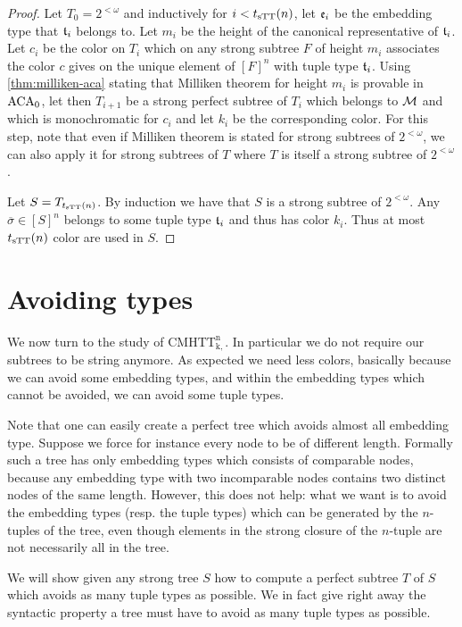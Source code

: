 \begin{proof}
Let $T_0 = 2^{<\omega}$ and inductively for $i < t_{\mathrm{sTT}}(n)$, let $\mathfrak{e}_{i}$ be the embedding type that $\mathfrak{t}_{i}$ belongs to. Let $m_i$ be the height of the canonical representative of $\mathfrak{t}_{i}$. Let $c_i$ be the color on $T_i$ which on any strong subtree $F$ of height $m_i$ associates the color $c$ gives on the unique element of $[F]^{n}$ with tuple type $\mathfrak{t}_i$. Using \cref{thm:milliken-aca} stating that Milliken theorem for height $m_i$ is provable in $\mathrm{ACA}_0$, let then $T_{i+1}$ be a strong perfect subtree of $T_i$ which belongs to $\mathcal{M}$ and which is monochromatic for $c_{i}$ and let $k_{i}$ be the corresponding color. For this step, note that even if Milliken theorem is stated for strong subtrees of $2^{<\omega}$, we can also apply it for strong subtrees of $T$ where $T$ is itself a strong subtree of $2^{<\omega}$.

Let $S = T_{t_{\mathrm{sTT}}(n)}$. By induction we have that $S$ is a strong subtree of $2^{<\omega}$. Any $\overline{\sigma} \in [S]^n$ belongs to some tuple type $\mathfrak{t}_{i}$ and thus has color $k_i$. Thus at most $t_{\mathrm{sTT}}(n)$ color are used in $S$.
\end{proof}

\section{Avoiding types}

We now turn to the study of $\mathrm{CMHTT^n_{k,}}$. In particular we do not require our subtrees to be string anymore. As expected we need less colors, basically because we can avoid some embedding types, and within the embedding types which cannot be avoided, we can avoid some tuple types. 

Note that one can easily create a perfect tree which avoids almost all embedding type. Suppose we force for instance every node to be of different length. Formally such a tree has only embedding types which consists of comparable nodes, because any embedding type with two incomparable nodes contains two distinct nodes of the same length. However, this does not help: what we want is to avoid the embedding types (resp. the tuple types) which can be generated by the $n$-tuples of the tree, even though elements in the strong closure of the $n$-tuple are not necessarily all in the tree.

We will show given any strong tree $S$ how to compute a perfect subtree $T$ of $S$ which avoids as many tuple types as possible. We in fact give right away the syntactic property a tree must have to avoid as many tuple types as possible.

